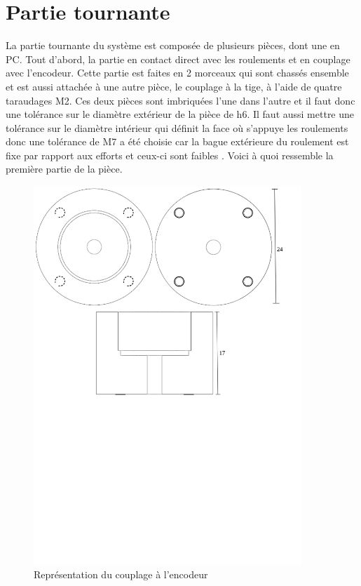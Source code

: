 \section{Partie tournante}\label{sec:PartieTour}
La partie tournante du système est composée de plusieurs pièces, dont une en \acrshort{PC}. Tout d'abord, la partie en contact direct
avec les roulements et en couplage avec l'encodeur. Cette partie est faites en 2 morceaux qui sont chassés ensemble et est aussi attachée
à une autre pièce, le couplage à la tige, à l'aide de quatre taraudages M2. Ces deux pièces sont imbriquées l'une dans l'autre et il faut donc
une tolérance sur le diamètre extérieur de la pièce de h6. Il faut aussi mettre une tolérance sur le diamètre intérieur qui définit la face où
s'appuye les roulements donc une tolérance de M7 a été choisie car la bague extérieure du roulement est fixe par rapport aux efforts et ceux-ci
sont faibles \cite{Ajustements}. Voici à quoi ressemble la première partie de la pièce.

\begin{figure}[H]
  \centering
  \includegraphics[width = 0.9\textwidth]{assets/figures/CouplageEncodeur.svg}
  \caption{Représentation du couplage à l'encodeur}
  \label{fig:CouplEnco}
\end{figure}

